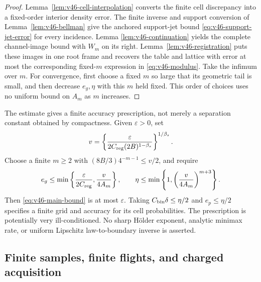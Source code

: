 \begin{proof}
Lemma~\ref{lem:v46-cell-interpolation} converts the finite cell discrepancy
into a fixed-order interior density error.  The finite inverse and support
conversion of Lemma~\ref{lem:v46-bellman} give the anchored support-jet
bound \eqref{eq:v46-support-jet-error} for every incidence.  Lemma
\ref{lem:v46-continuation} yields the complete channel-image bound with
$W_m$ on its right.  Lemma~\ref{lem:v46-registration} puts these images
in one root frame and recovers the table and lattice with error at most the
corresponding fixed-$m$ expression in \eqref{eq:v46-modulus}.
Take the infimum over $m$.  For convergence, first choose a fixed $m$
so large that its geometric tail is small, and then decrease $e_g,\eta$
with this $m$ held fixed.  This order of choices uses no uniform bound
on $A_m$ as $m$ increases.
\end{proof}

The estimate gives a finite accuracy prescription, not merely a separation
constant obtained by compactness.  Given $\varepsilon>0$, set
\[
 v=\left\{\frac{\varepsilon}
       {2C_{\rm reg}(2B)^{1-\beta_s}}\right\}^{1/\beta_s}.
\]
Choose a finite $m\ge2$ with $(8B/3)4^{-m-1}\le v/2$, and require
\begin{equation}\label{eq:v46-accuracy-prescription}
 e_g\le\min\left\{\frac{\varepsilon}{2C_{\rm reg}},
                          \frac v{4A_m}\right\},\qquad
 \eta\le\min\left\{1,\left(\frac v{4A_m}\right)^{m+3}\right\}.
\end{equation}
Then \eqref{eq:v46-main-bound} is at most $\varepsilon$.
Taking $C_{\rm bin}\delta\le\eta/2$ and $e_p\le\eta/2$ specifies a
finite grid and accuracy for its cell probabilities.  The prescription is
potentially very ill-conditioned.  No sharp H\"older exponent, analytic
minimax rate, or uniform Lipschitz law-to-boundary inverse is asserted.

\subsection{Finite samples, finite flights, and charged acquisition}

